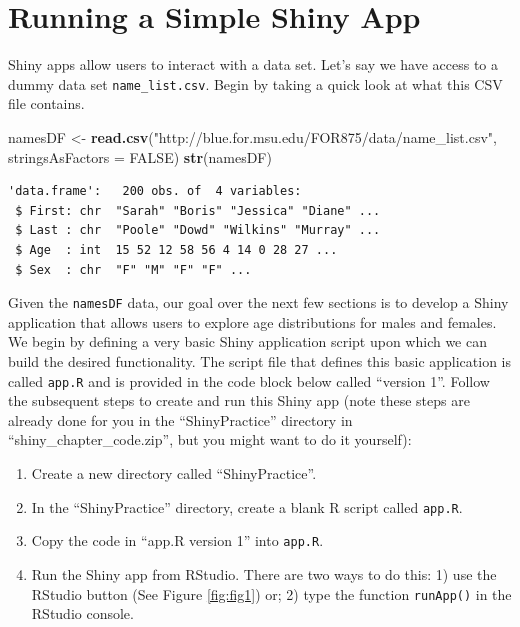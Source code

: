 \documentclass[]{krantz}
\makeatletter
\newenvironment{Shaded}{\begin{snugshade}}{\end{snugshade}}
\newcommand{\KeywordTok}[1]{\textcolor[rgb]{0.27,0.27,0.27}{\textbf{#1}}}
\newcommand{\DataTypeTok}[1]{\textcolor[rgb]{0.27,0.27,0.27}{#1}}
\newcommand{\StringTok}[1]{\textcolor[rgb]{0.5,0.5,0.5}{#1}}
\newcommand{\OtherTok}[1]{\textcolor[rgb]{0.37,0.37,0.37}{#1}}
\newcommand{\NormalTok}[1]{#1}
\providecommand{\tightlist}{%
  \setlength{\itemsep}{0pt}\setlength{\parskip}{0pt}}
\newenvironment{kframe}{%
\medskip{}
\setlength{\fboxsep}{.8em}
 \def\at@end@of@kframe{}%
 \ifinner\ifhmode%
  \def\at@end@of@kframe{\end{minipage}}%
  \begin{minipage}{\columnwidth}%
 \fi\fi%
 \def\FrameCommand##1{\hskip\@totalleftmargin \hskip-\fboxsep
 \colorbox{shadecolor}{##1}\hskip-\fboxsep
     \hskip-\linewidth \hskip-\@totalleftmargin \hskip\columnwidth}%
 \MakeFramed {\advance\hsize-\width
   \@totalleftmargin\z@ \linewidth\hsize
   \@setminipage}}%
 {\par\unskip\endMakeFramed%
 \at@end@of@kframe}
\renewenvironment{Shaded}{\begin{kframe}}{\end{kframe}}
\makeatother
\begin{document}
\section{Running a Simple Shiny App}\label{running-a-simple-shiny-app}

Shiny apps allow users to interact with a data set. Let's say we have
access to a dummy data set \texttt{name\_list.csv}. Begin by taking a
quick look at what this CSV file contains.

\begin{Shaded}
\begin{Highlighting}[]
\NormalTok{namesDF <-}\StringTok{ }\KeywordTok{read.csv}\NormalTok{(}\StringTok{"http://blue.for.msu.edu/FOR875/data/name_list.csv"}\NormalTok{, }
                    \DataTypeTok{stringsAsFactors =} \OtherTok{FALSE}\NormalTok{)}
\KeywordTok{str}\NormalTok{(namesDF)}
\end{Highlighting}
\end{Shaded}

\begin{verbatim}
'data.frame':   200 obs. of  4 variables:
 $ First: chr  "Sarah" "Boris" "Jessica" "Diane" ...
 $ Last : chr  "Poole" "Dowd" "Wilkins" "Murray" ...
 $ Age  : int  15 52 12 58 56 4 14 0 28 27 ...
 $ Sex  : chr  "F" "M" "F" "F" ...
\end{verbatim}

Given the \texttt{namesDF} data, our goal over the next few sections is
to develop a Shiny application that allows users to explore age
distributions for males and females. We begin by defining a very basic
Shiny application script upon which we can build the desired
functionality. The script file that defines this basic application is
called \texttt{app.R} and is provided in the code block below called
``version 1''. Follow the subsequent steps to create and run this Shiny
app (note these steps are already done for you in the ``ShinyPractice''
directory in ``shiny\_chapter\_code.zip'', but you might want to do it
yourself):

\begin{enumerate}
\def\labelenumi{\arabic{enumi}.}
\tightlist
\item
  Create a new directory called ``ShinyPractice''.
\item
  In the ``ShinyPractice'' directory, create a blank R script called
  \texttt{app.R}.
\item
  Copy the code in ``app.R version 1'' into \texttt{app.R}.
\item
  Run the Shiny app from RStudio. There are two ways to do this: 1) use
  the RStudio button (See Figure \ref{fig:fig1}) or; 2) type the
  function \texttt{runApp()} in the RStudio console.
\end{enumerate}
\end{document}
